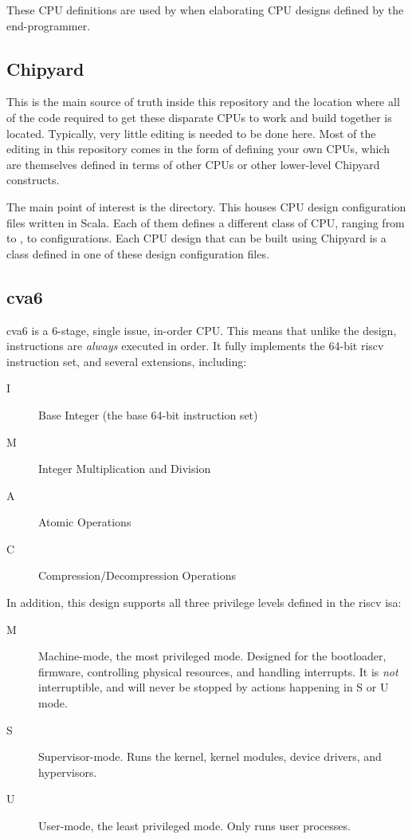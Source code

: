 These CPU definitions are used by  when elaborating CPU designs defined by the end-programmer.

\subsection{Chipyard}\label{sec:Chipyard_Generator}
This is the main source of truth inside this repository and the location where all of the code required to get these disparate CPUs to work and build together is located.
Typically, very little editing is needed to be done here.
Most of the editing in this repository comes in the form of defining your own CPUs, which are themselves defined in terms of other CPUs or other lower-level Chipyard constructs.

The main point of interest is the  directory.
This houses CPU design configuration files written in Scala.
Each of them defines a different class of CPU, ranging from  to , to  configurations.
Each CPU design that can be built using Chipyard is a class defined in one of these design configuration files.

\subsection{cva6}\label{sec:cva6_Generator}
\nocite{cva6Github}
\nocite{zaruba2019cost}
cva6 is a 6-stage, single issue, in-order CPU.\@
This means that unlike the  design, instructions are \emph{always} executed in order.
It fully implements the 64-bit \Gls{riscv} instruction set, and several extensions, including:
\begin{description}
\item[I] Base Integer (the base 64-bit instruction set)
\item[M] Integer Multiplication and Division
\item[A] Atomic Operations
\item[C] Compression/Decompression Operations
\end{description}

In addition, this design supports all three privilege levels defined in the \Gls{riscv} \Gls{isa}:
\begin{description}
\item[M] Machine-mode, the most privileged mode.
  Designed for the bootloader, firmware, controlling physical resources, and handling interrupts.
  It is \emph{not} interruptible, and will never be stopped by actions happening in S or U mode.
\item[S] Supervisor-mode. Runs the kernel, kernel modules, device drivers, and hypervisors.
\item[U] User-mode, the least privileged mode. Only runs user processes.
\end{description}

